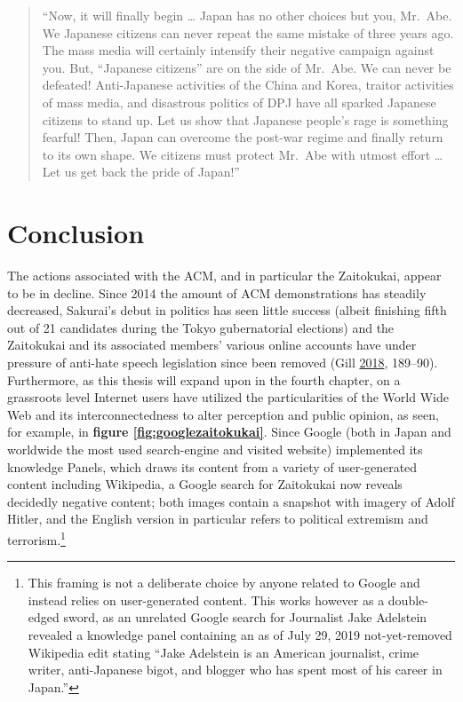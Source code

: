 \documentclass[10pt,british,A4paper,,openany]{memoir}
\begin{document}
\begin{quote}
``Now, it will finally begin \ldots{} Japan has no other choices but
you, Mr.~Abe. We Japanese citizens can never repeat the same mistake of
three years ago. The mass media will certainly intensify their negative
campaign against you. But, ``Japanese citizens'' are on the side of
Mr.~Abe. We can never be defeated! Anti-Japanese activities of the China
and Korea, traitor activities of mass media, and disastrous politics of
DPJ have all sparked Japanese citizens to stand up. Let us show that
Japanese people's rage is something fearful! Then, Japan can overcome
the post-war regime and finally return to its own shape. We citizens
must protect Mr.~Abe with utmost effort \ldots{} Let us get back the
pride of Japan!''
\end{quote}

\section{Conclusion}\label{conclusion}

The actions associated with the ACM, and in particular the Zaitokukai,
appear to be in decline. Since 2014 the amount of ACM demonstrations has
steadily decreased, Sakurai's debut in politics has seen little success
(albeit finishing fifth out of 21 candidates during the Tokyo
gubernatorial elections) and the Zaitokukai and its associated members'
various online accounts have under pressure of anti-hate speech
legislation since been removed (Gill
\protect\hyperlink{ref-gill_nativist_2018}{2018}, 189--90). Furthermore,
as this thesis will expand upon in the fourth chapter, on a grassroots
level Internet users have utilized the particularities of the World Wide
Web and its interconnectedness to alter perception and public opinion,
as seen, for example, in \textbf{figure \ref{fig:googlezaitokukai}}.
Since Google (both in Japan and worldwide the most used search-engine
and visited website) implemented its knowledge Panels, which draws its
content from a variety of user-generated content including Wikipedia, a
Google search for Zaitokukai now reveals decidedly negative content;
both images contain a snapshot with imagery of Adolf Hitler, and the
English version in particular refers to political extremism and
terrorism.\footnote{This framing is not a deliberate choice by anyone
  related to Google and instead relies on user-generated content. This
  works however as a double-edged sword, as an unrelated Google search
  for Journalist Jake Adelstein revealed a knowledge panel containing an
  as of July 29, 2019 not-yet-removed Wikipedia edit stating ``Jake
  Adelstein is an American journalist, crime writer, anti-Japanese
  bigot, and blogger who has spent most of his career in Japan.''}
\end{document}

